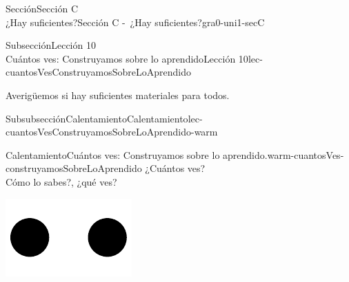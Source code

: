 %
%
\typeout{************************************************}
\typeout{************************************************}
%
\begin{sectionptx}{Sección}{{\Large Sección C\\}¿Hay suficientes?}{}{Sección C -~¿Hay suficientes?}{}{}{gra0-uni1-secC}
%
%
\typeout{************************************************}
\typeout{************************************************}
%
\begin{subsectionptx}{Subsección}{{\normalsize Lección 10\\[-0.05cm]}Cuántos ves: Construyamos sobre lo aprendido}{}{Lección 10}{}{}{lec-cuantosVesConstruyamosSobreLoAprendido}
\begin{introduction}{}%
Averigüemos si hay suficientes materiales para todos.%
\end{introduction}%
%
%
\typeout{************************************************}
\typeout{************************************************}
%
\begin{subsubsectionptx}{Subsubsección}{Calentamiento}{}{Calentamiento}{}{}{lec-cuantosVesConstruyamosSobreLoAprendido-warm}
\begin{exploration}{Calentamiento}{Cuántos ves: Construyamos sobre lo aprendido.}{warm-cuantosVes-construyamosSobreLoAprendido}%
¿Cuántos ves?\\
 Cómo lo sabes?, ¿qué ves?%
\begin{sidebyside}{2}{0}{0}{0}%
\begin{sbspanel}{0.5}%
\includegraphics[max width=\linewidth, center]{external/svg-source/tikz-file-136323.pdf}

\end{sbspanel}
\end{sidebyside}
\end{exploration}
\end{subsubsectionptx}
\end{subsectionptx}
\end{sectionptx}

